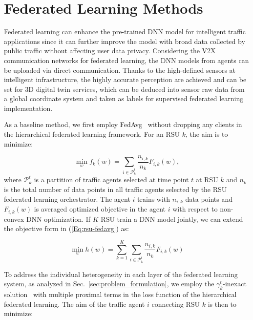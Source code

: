 \section{Federated Learning Methods}
\label{sec:method}

Federated learning can enhance the pre-trained DNN model for intelligent traffic applications since it can further improve the model with broad data collected by public traffic without affecting user data privacy. Considering the V2X communication networks for federated learning, the DNN models from agents can be uploaded via direct communication. Thanks to the high-defined sensors at intelligent infrastructure, the highly accurate perception are achieved and can be set for 3D digital twin services, which can be deduced into sensor raw data from a global coordinate system and taken as labels for supervised federated learning implementation.

As a baseline method, we first employ FedAvg~\cite{pmlr-v54-mcmahan17a} without dropping any clients in the hierarchical federated learning framework. For an RSU $k$, the aim is to minimize: 

\begin{equation}
    \label{Eq:rsu-fedavg}
    \min_{w} f_k(w) = \sum_{i \in \mathcal{P}_k^t} \frac{n_{i,k}}{n_k} F_{i,k}(w), %
\end{equation}
where $\mathcal{P}_k^t$ is a partition of traffic agents selected at time point $t$ at RSU $k$ and $n_k$ is the total number of data points in all traffic agents selected by the RSU federated learning orchestrator. The agent $i$ trains with $n_{i,k}$ data points and $F_{i,k}(w)$ is averaged optimized objective in the agent $i$ with respect to non-convex DNN optimization.
If $K$ RSU train a DNN model jointly, we can extend the objective form in (\ref{Eq:rsu-fedavg}) as:

\begin{equation}
    \label{Eq:rsu-fedavg-ext}
    \min_{w} h(w) = \sum_{k=1}^{K} \sum_{i \in \mathcal{P}_k^t} \frac{n_{i,k}}{n_k} F_{i,k}(w) %
\end{equation}

To address the individual heterogeneity in each layer of the federated learning system, as analyzed in Sec.~\ref{sec:problem_formulation}, we employ the $\gamma_k^t$-inexact solution~\cite{li2020federated} with multiple proximal terms in the loss function of the hierarchical federated learning. The  aim of the traffic agent $i$ connecting RSU $k$ is then to minimize:

